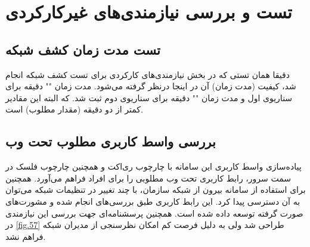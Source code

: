 \cleardoublepage

\section{تست و بررسی نیازمندی‌های غیرکارکردی}


\subsection{تست مدت زمان کشف شبکه}

دقیقا همان تستی که در بخش نیازمندی‌های کارکردی برای تست کشف شبکه انجام شد، کیفیت (مدت زمان) آن در اینجا درنظر گرفته می‌شود. مدت زمان "" دقیقه برای سناریوی اول و مدت زمان "" دقیقه برای سناریوی دوم ثبت شد. که البته این مقادیر کمتر از دو دقیقه (مقدار مطلوب) است.

\subsection{بررسی واسط کاربری مطلوب تحت وب}

پیاده‌سازی واسط کاربری این سامانه با چارچوب ری‌اکت و همچنین چارچوب فلسک در سمت سرور، رابط کاربری تحت وب مطلوبی را برای افراد فراهم می‌آورد. همچنین برای استفاده از سامانه بیرون از شبکه سازمان، با چند تغییر در تنظیمات شبکه می‌توان به آن دسترسی پیدا کرد. این رابط کاربری طبق بررسی‌های انجام شده و مشورت‌های صورت گرفته توسعه داده شده است. همچنین پرسشنامه‌ای جهت بررسی این نیازمندی در \cref{fig.57} طراحی شد ولی به دلیل فرصت کم امکان نظرسنجی از مدیران شبکه فراهم نشد.


